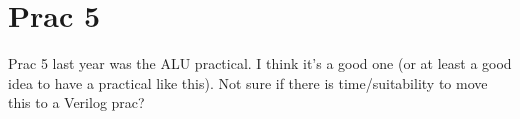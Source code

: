 \section{Prac 5}
Prac 5 last year was the ALU practical. I think it's a good one (or at least a good idea to have a practical like this). Not sure if there is time/suitability to move this to a Verilog prac?